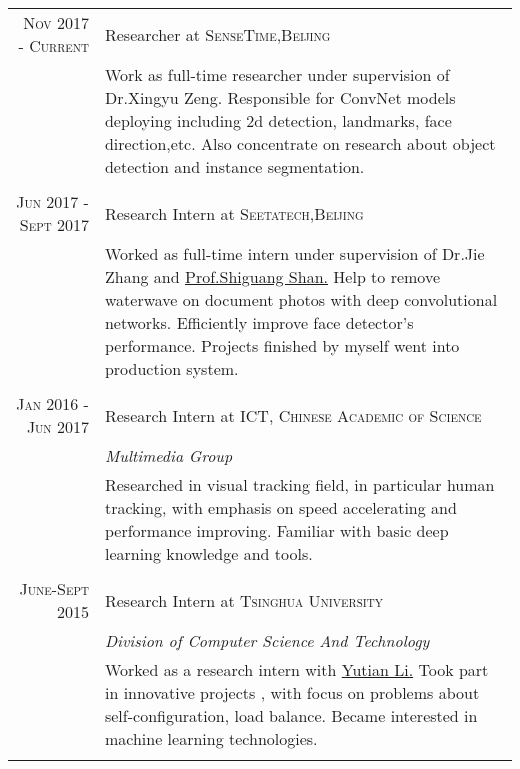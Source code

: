 \documentclass[a4paper,10pt]{article}
\begin{document}
\begin{tabular}{r|p{11cm}}

 \textsc{Nov 2017 - Current} & Researcher at \textsc{SenseTime,Beijing} \\&\footnotesize{Work as full-time researcher under supervision of Dr.Xingyu Zeng. Responsible for ConvNet models deploying including 2d detection, landmarks, face direction,etc. Also concentrate on research about object detection and instance segmentation.}\\\multicolumn{2}{c}{} \\


 \textsc{Jun 2017 - Sept 2017} & Research Intern at \textsc{Seetatech,Beijing} \\&\footnotesize{Worked as full-time intern under supervision of Dr.Jie Zhang and} \href{http://www.jdl.ac.cn/user/sgshan/index_en.htm}{Prof.Shiguang Shan.} \footnotesize{Help to remove waterwave on document photos with deep convolutional networks. Efficiently improve face detector's performance. Projects finished by myself went into production system.}\\\multicolumn{2}{c}{} \\

 \textsc{Jan 2016 - Jun 2017} & Research Intern at \textsc{ICT, Chinese Academic of Science} \\&\emph{Multimedia Group}\\&\footnotesize{Researched in visual tracking field, in particular human tracking, with emphasis on speed accelerating and performance improving. Familiar with basic deep learning knowledge and tools.}\\\multicolumn{2}{c}{} \\
 \textsc{June-Sept 2015} & Research Intern at \textsc{Tsinghua University}  \\&\emph{Division of Computer Science And Technology}\\& \footnotesize{Worked as a research intern with }\href{https://yutian.li/}{Yutian Li.} \footnotesize{Took part in innovative projects , with focus on problems about self-configuration, load balance. Became interested in machine learning technologies.}\\\multicolumn{2}{c}{} \\

\end{tabular}
\end{document}

